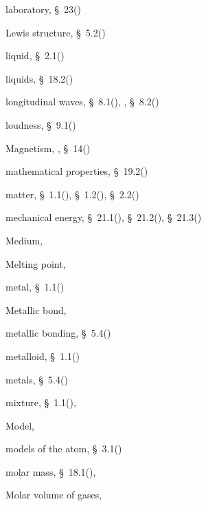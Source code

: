 \begin{multicols}{2}
{\begin{description}
	  laboratory,  \S~23(\pageref{m38491})
	  \item[] \noindent\raggedright Lewis structure,  \S~5.2(\pageref{m38701})
	  \item[] \noindent\raggedright liquid,  \S~2.1(\pageref{m38736})
	  \item[] \noindent\raggedright liquids,  \S~18.2(\pageref{m38712})
	  \item[] \noindent\raggedright longitudinal waves,  \S~8.1(\pageref{m38782}),  \pageref{id2444157},  \S~8.2(\pageref{m38783})
	  \item[] \noindent\raggedright loudness,  \S~9.1(\pageref{m38799})
	  \vspace{.3cm}
	  \item[{\large \bfseries M}]\noindent\raggedright
	  Magnetism,  \pageref{id2410309},  \S~14(\pageref{m37830})
	  \item[] \noindent\raggedright mathematical properties,  \S~19.2(\pageref{m38813})
	  \item[] \noindent\raggedright matter,  \S~1.1(\pageref{m38708}),  \S~1.2(\pageref{m38706}),  \S~2.2(\pageref{m38734})
	  \item[] \noindent\raggedright mechanical energy,  \S~21.1(\pageref{m38784}),  \S~21.2(\pageref{m38785}),  \S~21.3(\pageref{m38786})
	  \item[] \noindent\raggedright Medium,  \pageref{id2434692}
	  \item[] \noindent\raggedright Melting point,  \pageref{id2412224}
	  \item[] \noindent\raggedright metal,  \S~1.1(\pageref{m38708})
	  \item[] \noindent\raggedright Metallic bond,  \pageref{id2431026}
	  \item[] \noindent\raggedright metallic bonding,  \S~5.4(\pageref{m38694})
	  \item[] \noindent\raggedright metalloid,  \S~1.1(\pageref{m38708})
	  \item[] \noindent\raggedright metals,  \S~5.4(\pageref{m38694})
	  \item[] \noindent\raggedright mixture,  \S~1.1(\pageref{m38708}),  \pageref{id2405672}
	  \item[] \noindent\raggedright Model,  \pageref{id2414493}
	  \item[] \noindent\raggedright models of the atom,  \S~3.1(\pageref{m38756})
	  \item[] \noindent\raggedright molar mass,  \S~18.1(\pageref{m38717}),  \pageref{id2496969}
	  \item[] \noindent\raggedright Molar volume of gases,  \pageref{id2504818}

\end{description}}
\end{multicols}
